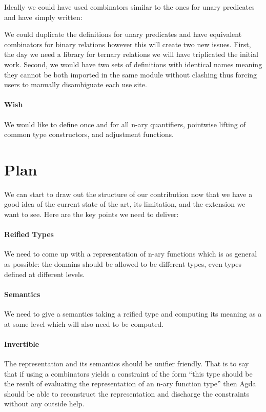 
Ideally we could have used combinators similar to the ones for unary predicates
and have simply written:


We could duplicate the definitions for unary predicates and have equivalent
combinators for binary relations however this will create two new issues.
First, the day we need a library for ternary relations we will have triplicated
the initial work. Second, we would have two sets of definitions with identical
names meaning they cannot be both imported in the same module without clashing
thus forcing users to manually disambiguate each use site.

\paragraph{Wish} We would like to define once and for all n-ary quantifiers,
pointwise lifting of common type constructors, and adjustment functions.

\section{Plan} We can start to draw out the structure of our contribution now
that we have a good idea of the current state of the art, its limitation, and
the extension we want to see. Here are the key points we need to deliver:

\paragraph{Reified Types} We need to come up with a representation of n-ary
functions which is as general as possible: the domains should be allowed to
be different types, even types defined at different levels.

\paragraph{Semantics} We need to give a semantics taking a reified type and
computing its meaning as a  at some level which will also need to
be computed.

\paragraph{Invertible} The representation and its semantics should be unifier
friendly. That is to say that if using a combinators yields a constraint of
the form ``this type should be the result of evaluating the representation of
an n-ary function type'' then Agda should be able to reconstruct the
representation and discharge the constraints without any outside help.

